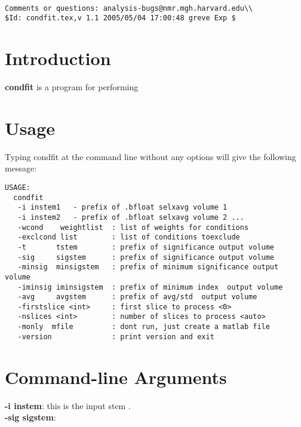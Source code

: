 \documentclass[10pt]{article}
\begin{document}
\begin{Large}
 \\
\end{Large}

\noindent 
\begin{verbatim}
Comments or questions: analysis-bugs@nmr.mgh.harvard.edu\\
$Id: condfit.tex,v 1.1 2005/05/04 17:00:48 greve Exp $
\end{verbatim}

\section{Introduction}
{\bf condfit} is a program for performing 


\section{Usage}
Typing condfit at the command line without any options will give the
following message:\\ 

\begin{small}
\begin{verbatim}
USAGE:
  condfit
   -i instem1   - prefix of .bfloat selxavg volume 1
   -i instem2   - prefix of .bfloat selxavg volume 2 ...
   -wcond    weightlist  : list of weights for conditions
   -exclcond list        : list of conditions toexclude
   -t       tstem        : prefix of significance output volume
   -sig     sigstem      : prefix of significance output volume
   -minsig  minsigstem   : prefix of minimum significance output volume
   -iminsig iminsigstem  : prefix of minimum index  output volume
   -avg     avgstem      : prefix of avg/std  output volume
   -firstslice <int>     : first slice to process <0>
   -nslices <int>        : number of slices to process <auto>
   -monly  mfile         : dont run, just create a matlab file
   -version              : print version and exit
\end{verbatim}
\end{small}

\section{Command-line Arguments}

\noindent
{\bf -i instem}: this is the input stem .\\

\noindent
{\bf -sig sigstem}: 
\end{document}
